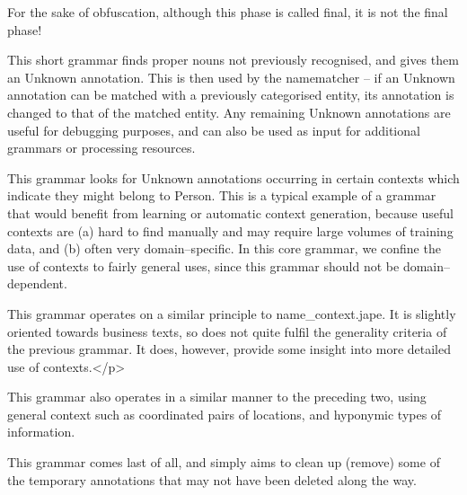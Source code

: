 For the sake of obfuscation, although this phase is called final, it
is not the final phase!


This short grammar finds proper nouns not previously recognised,
and gives them an Unknown annotation. This is then used by the
namematcher -- if an Unknown annotation can be matched with a
previously categorised entity, its annotation is changed to that of
the matched entity. Any remaining Unknown annotations are useful
for debugging purposes, and can also be used as input for additional
grammars or processing resources.



This grammar looks for Unknown annotations occurring in certain
contexts which indicate they might belong to Person. This is a typical
example of a grammar that would benefit from learning or automatic
context generation, because useful contexts are (a) hard to find
manually and may require large volumes of training data, and (b) often
very domain--specific. In this core grammar, we confine the use of
contexts to fairly general uses, since this grammar should not be
domain--dependent.


This grammar operates on a similar principle to name\_context.jape. It
is slightly oriented towards business texts, so does not quite fulfil
the generality criteria of the previous grammar. It does, however,
provide some insight into more detailed use of contexts.</p>


This grammar also operates in a similar manner to the preceding two,
using general context such as coordinated pairs of locations, and
hyponymic types of information.


This grammar comes last of all, and simply aims to clean up (remove)
some of the temporary annotations that may not have been deleted along
the way.

%







